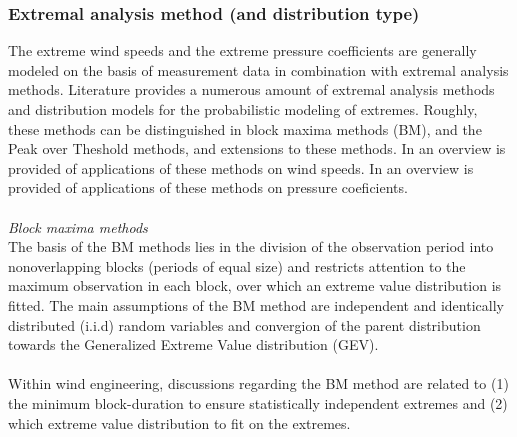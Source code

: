 \documentclass[fleqn]{article}
\begin{document}
\subsubsection{Extremal analysis method (and distribution type)}
The extreme wind speeds and the extreme pressure coefficients are generally modeled on the basis of measurement data in combination with extremal analysis methods. 
Literature provides a numerous amount of extremal analysis methods and distribution models for the probabilistic modeling of extremes. Roughly, these methods can be distinguished in block maxima methods (BM), and the Peak over Theshold methods, and extensions to these methods. In \cite{Palutikov} an overview is provided of applications of these methods on wind speeds. In \cite{} an overview is provided of applications of these methods on pressure coeficients. \\
\\
\textit{Block maxima methods}\\
The basis of the BM methods lies in the division of the observation period into nonoverlapping blocks (periods of equal size) and restricts attention to the maximum observation in each block, over which an extreme value distribution is fitted. The main assumptions of the BM method are independent and identically distributed (i.i.d) random variables and convergion of the parent distribution towards the Generalized Extreme Value distribution (GEV). \\
\\
Within wind engineering, discussions regarding  the BM method are related to (1) the minimum block-duration to ensure statistically independent extremes and (2) which extreme value distribution to fit on the extremes. 
\end{document}
